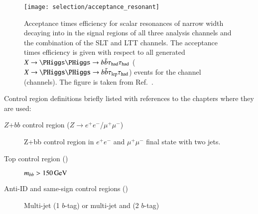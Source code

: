 \begin{figure}[htbp]
  \centering

  \texttt{[image: selection/acceptance\_resonant]}

  \caption{Acceptance times efficiency for scalar resonances of narrow
    width decaying into \HH in the signal regions of all three
    analysis channels and the combination of the \lephad SLT and LTT
    channels. The acceptance times efficiency is given with respect to
    all generated $X \to \HH \to \bbbar\hadhad$
    ($X \to \HH \to \bbbar\lephad$) events for the \hadhad channel
    (\lephad channels). The figure is taken from
    Ref.~\cite{ATLAS-CONF-2021-030}.}%
  \label{fig:signal_acceptance_resonant}

\end{figure}

Control region definitions briefly listed with references to the
chapters where they are used:
\begin{description}

\item[$Z$+$bb$ control region ($Z \to e^+e^-$/$\mu^+\mu^-$)] Z+bb
  control region in $e^+e^-$ and $\mu^+\mu^-$ final state with two
  \btagged jets.

\item[Top control region (\lephad)] $m_{bb} > \SI{150}{\ensuremath{\text{GeV}}}$

\item[Anti-ID and same-sign control regions (\hadhad)] Multi-jet (1
  $b$-tag) or multi-jet and \ttbar (2 $b$-tag)

\item[]

\end{description}








